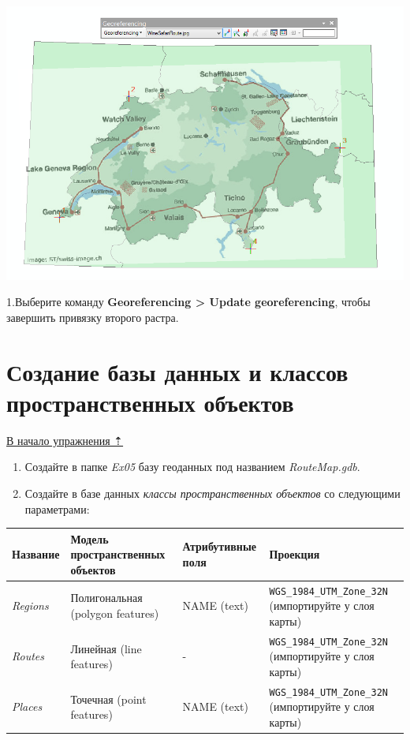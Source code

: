 \documentclass[]{book}
\theoremstyle{definition}
\theoremstyle{definition}
\theoremstyle{definition}
\theoremstyle{remark}
\begin{document}
\begin{enumerate}
  \includegraphics{images/Ex05/image13.png}
\end{enumerate}

1.Выберите команду \textbf{Georeferencing \textgreater{} Update
georeferencing}, чтобы завершить привязку второго растра.

\hypertarget{map-ref-general-geodatabase}{%
\section{Создание базы данных и классов пространственных
объектов}\label{map-ref-general-geodatabase}}

\protect\hyperlink{map-ref-general}{В начало упражнения ⇡}

\begin{enumerate}
\def\labelenumi{\arabic{enumi}.}
\item
  Создайте в папке \emph{Ex05} базу геоданных под названием
  \emph{RouteMap.gdb}.
\item
  Создайте в базе данных \emph{классы пространственных объектов} со
  следующими параметрами:
\end{enumerate}

\begin{longtable}[]{@{}llll@{}}
\toprule
Название & Модель пространственных объектов & Атрибутивные поля &
Проекция\tabularnewline
\midrule
\endhead
\emph{Regions} & Полигональная (polygon features) & NAME (text) &
\texttt{WGS\_1984\_UTM\_Zone\_32N} (импортируйте у слоя
карты)\tabularnewline
\emph{Routes} & Линейная (line features) & - &
\texttt{WGS\_1984\_UTM\_Zone\_32N} (импортируйте у слоя
карты)\tabularnewline
\emph{Places} & Точечная (point features) & NAME (text) &
\texttt{WGS\_1984\_UTM\_Zone\_32N} (импортируйте у слоя
карты)\tabularnewline
\bottomrule
\end{longtable}
\end{document}
